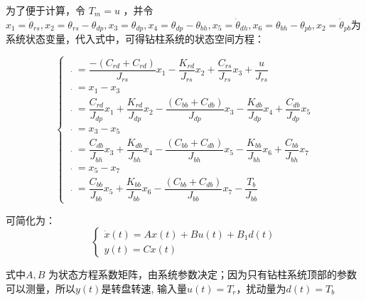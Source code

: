 \documentclass[12pt,hyperref,a4paper,UTF8]{ctexart}
\begin{document}
	为了便于计算，令 $T_m =u$ ，并令 $x_1  = \dot \theta_{rs}, x_2  = \theta_{rs} -  \theta_{dp},x_3  = \theta_{dp}, x_4  = \theta_{dp} -  \theta_{bh}, x_5  = \dot \theta_{dh}, x_6  = \theta_{bh} -  \theta_{pb}, x_2  = \dot \theta_{pb}$为系统状态变量，代入式中，可得钻柱系统的状态空间方程：
	
	\begin{equation}
		\left\{ {\begin{array}{*{20}{l}}
				{\mathop {{x_1}}\limits^.  = \dfrac{{ - ({C_{rd}} + {C_{rd}})}}{{{J_{rs}}}}{x_1} - \dfrac{{{K_{rd}}}}{{{J_{rs}}}}{x_2} + \dfrac{{{C_{rs}}}}{{{J_{rs}}}}{x_3} + \dfrac{u}{{{J_{rs}}}}}\\
				{\mathop {{x_2}}\limits^.  = {x_1} - {x_3}}\\
				{\mathop {{x_3}}\limits^.  = \dfrac{{{C_{rd}}}}{{{J_{dp}}}}{x_1} + \dfrac{{{K_{rd}}}}{{{J_{dp}}}}{x_2} - \dfrac{{({C_{bb}} + {C_{db}})}}{{{J_{dp}}}}{x_3} - \dfrac{{{K_{db}}}}{{{J_{dp}}}}{x_4} + \dfrac{{{C_{db}}}}{{{J_{dp}}}}{x_5}}\\
				{\mathop {{x_4}}\limits^.  = {x_3} - {x_5}}\\
				{\mathop {{x_5}}\limits^.  = \dfrac{{{C_{db}}}}{{{J_{bh}}}}{x_3} + \dfrac{{{K_{db}}}}{{{J_{bh}}}}{x_4} - \dfrac{{({C_{bb}} + {C_{db}})}}{{{J_{bh}}}}{x_5} - \dfrac{{{K_{bb}}}}{{{J_{bh}}}}{x_6} + \dfrac{{{C_{bb}}}}{{{J_{bh}}}}{x_7}}\\
				{\mathop {{x_6}}\limits^.  = {x_5} - {x_7}}\\
				{\mathop {{x_7}}\limits^.  = \dfrac{{{C_{bb}}}}{{{J_{bb}}}}{x_5} + \dfrac{{{K_{bb}}}}{{{J_{bb}}}}{x_6} - \dfrac{{({C_{bb}} + {C_{db}})}}{{{J_{bb}}}}{x_7} - \dfrac{{{T_b}}}{{{J_{bb}}}}}
		\end{array}} \right.
	\end{equation}
	
	可简化为：
	\begin{equation}
		\begin{cases} \dot{x}(t)=Ax(t)+Bu(t)+B_{1}d(t)\\ y(t)=Cx(t) \end{cases} 
	\end{equation}
	
	
	式中$A, B$ 为状态方程系数矩阵，由系统参数决定；因为只有钻柱系统顶部的参数可以测量，所以$ y(t)$是转盘转速,
	输入量$u(t) = T_r$，扰动量为$d(t)=T_b$                 
	
\end{document}
